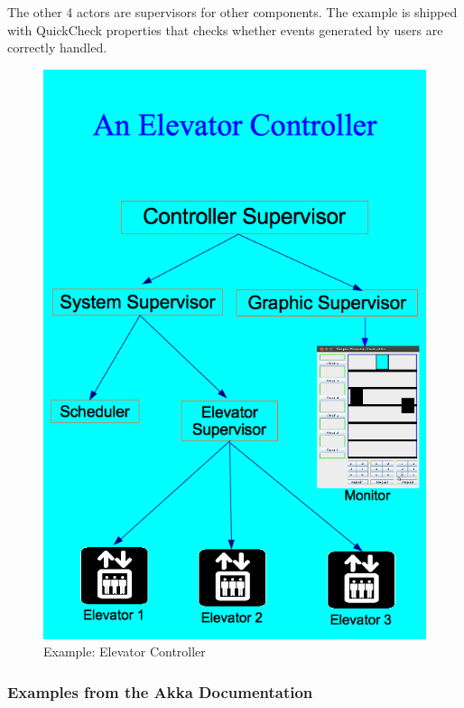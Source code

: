 The other 4 actors are supervisors for other components.  The example is 
shipped with QuickCheck properties that checks whether events generated by 
users are correctly handled.



\begin{figure}[p]
     \begin{center}
\includegraphics[keepaspectratio=true,height=0.6\paperheight]
{Pictures/ElevatorController.png}
    \end{center}
     \caption{Example:  Elevator Controller}
   \label{elevator_controller}   
\end{figure}

\subsubsection{Examples from the Akka Documentation}


